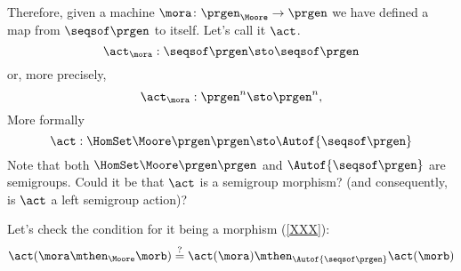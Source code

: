 Therefore, given a machine $\mora \colon \prgen_{\Moore} \to \prgen$ we have defined a map from $\seqsof \prgen$ to itself. Let's call it $\act$.
% 
\begin{equation}
\act_{\mora}: \seqsof \prgen \sto \seqsof \prgen
\end{equation}
% 
or, more precisely,
% 
\begin{equation}
  \act_{\mora}: \prgen^n \sto   \prgen^n ,
  \end{equation}
  More formally
% 
  \begin{equation}
    \act: \HomSet\Moore\prgen\prgen \sto \Autof {\seqsof \prgen}
\end{equation}
%
Note that both $\HomSet\Moore\prgen\prgen$ and $\Autof {\seqsof \prgen}$ are semigroups. Could it be that $\act$ is a semigroup morphism? (and consequently, is $\act$ a left semigroup action)?


Let's check the condition for it being a morphism (\cref{XXX}):
\begin{equation}
  \act ( \mora \mthen_{\Moore} \morb) \stackrel{?}{=}  \act ( \mora) \mthen_{\Autof  {\seqsof \prgen}} \act(\morb)
\end{equation}


